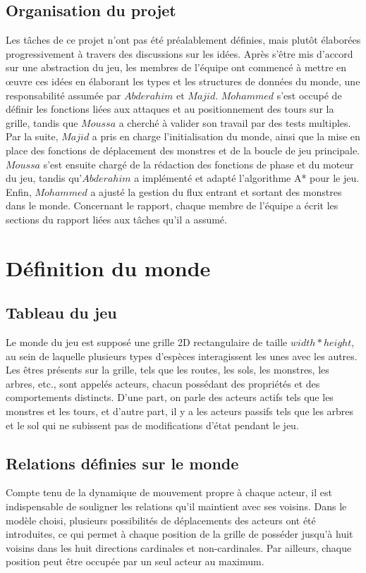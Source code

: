 \documentclass[11pt]{article}
\begin{document}
        \subsection{Organisation du projet}
       Les tâches de ce projet n'ont pas été préalablement définies, mais plutôt élaborées progressivement à travers des discussions sur les idées. Après s'être mis d'accord sur une abstraction du jeu, les membres de l'équipe ont commencé à mettre en œuvre ces idées en élaborant les types et les structures de données du monde, une responsabilité assumée par $Abderahim$ et $Majid$. $Mohammed$ s'est occupé de définir les fonctions liées aux attaques et au positionnement des tours sur la grille, tandis que $Moussa$ a cherché à valider son travail par des tests multiples. Par la suite, $Majid$ a pris en charge l'initialisation du monde, ainsi que la mise en place des fonctions de déplacement des monstres et de la boucle de jeu principale. $Moussa$ s'est ensuite chargé de la rédaction des fonctions de phase et du moteur du jeu, tandis qu'$Abderahim$ a implémenté et adapté l'algorithme A* pour le jeu. Enfin, $Mohammed$ a ajusté la gestion du flux entrant et sortant des monstres dans le monde. Concernant le rapport, chaque membre de l'équipe a écrit les sections du rapport liées aux tâches qu'il a assumé.
            
    \section{Définition du monde }
        \subsection{Tableau du jeu}
            Le monde du jeu est supposé une grille 2D rectangulaire de taille $width*height$, au sein de laquelle plusieurs types d'espèces interagissent les unes avec les autres. Les êtres présents sur la grille, tels que les routes, les sols, les monstres, les arbres, etc., sont appelés acteurs, chacun possédant des propriétés et des comportements distincts. D'une part, on parle des acteurs actifs tels que les monstres et les tours, et d'autre part, il y a les acteurs passifs tels que les arbres et le sol qui ne subissent pas de modifications d'état pendant le jeu.
        \subsection{Relations définies sur le monde}
            Compte tenu de la dynamique de mouvement propre à chaque acteur, il est indispensable de souligner les relations qu'il maintient avec ses voisins. Dans le modèle choisi, plusieurs possibilités de déplacements des acteurs ont été introduites, ce qui permet à chaque position de la grille de posséder jusqu'à huit voisins dans les huit directions cardinales et non-cardinales. Par ailleurs, chaque position peut être occupée par un seul acteur au maximum.
\end{document}
